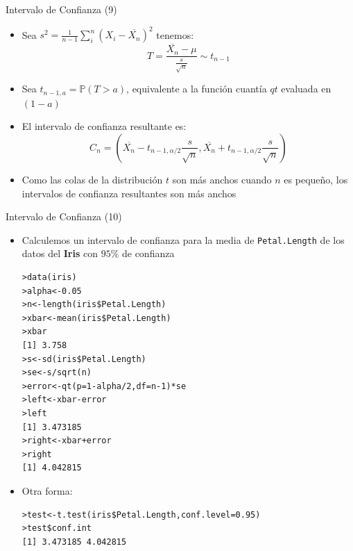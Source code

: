 \documentclass[handout]{beamer}
\begin{document}
\begin{frame}{Intervalo de Confianza (9) }

\scriptsize{
\begin{itemize}
 \item Sea  $s^{2}= \frac{1}{n-1} \sum_{i}^{n}(X_{i}-\overline{X_{n}})^2$ tenemos:
 \begin{displaymath}
  T=\frac{\overline{X_{n}}-\mu}{\frac{s}{\sqrt{n}}}\sim t_{n-1}
 \end{displaymath}
\item Sea $t_{n-1,a}=\mathbb{P}(T>a)$, equivalente a la función cuantía $qt$ evaluada en $(1-a)$
\item El intervalo de confianza resultante es:
       \begin{displaymath}
 C_n = (\overline{X_{n}}-t_{n-1,\alpha/2}\frac{s}{\sqrt{n}} , \overline{X_{n}} + t_{n-1,\alpha/2}\frac{s}{\sqrt{n}}) 
 \end{displaymath} 
 \item Como las colas de la distribución $t$ son más anchos cuando $n$ es pequeño, los intervalos de confianza resultantes son más anchos

\end{itemize}


}

\end{frame}


\begin{frame}[fragile]{Intervalo de Confianza (10)}
\scriptsize{
\begin{itemize}
 \item Calculemos un intervalo de confianza para la media de \verb+Petal.Length+ de los datos del \textbf{Iris} con $95\%$ de confianza
\begin{verbatim}
>data(iris)
>alpha<-0.05
>n<-length(iris$Petal.Length)
>xbar<-mean(iris$Petal.Length)
>xbar
[1] 3.758
>s<-sd(iris$Petal.Length)
>se<-s/sqrt(n)
>error<-qt(p=1-alpha/2,df=n-1)*se
>left<-xbar-error
>left
[1] 3.473185
>right<-xbar+error
>right
[1] 4.042815
\end{verbatim}
\item Otra forma:
\begin{verbatim}
>test<-t.test(iris$Petal.Length,conf.level=0.95)
>test$conf.int
[1] 3.473185 4.042815
\end{verbatim}


\end{itemize}



}
 
\end{frame}
\end{document}
